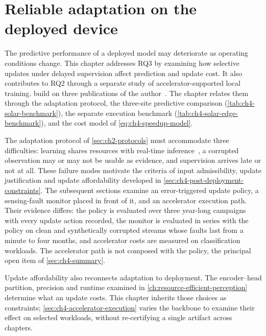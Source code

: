 \chapter{Reliable adaptation on the deployed device}
\label{ch:on-device-adaptation}

The predictive performance of a deployed model may deteriorate as operating conditions change. This chapter addresses RQ3 by examining how selective updates under delayed supervision affect prediction and update cost. It also contributes to RQ2 through a separate study of accelerator-supported local training.  build on three publications of the author~\cite{10.1007/978-3-032-07343-328,Piechocki2025:i63677,piechocki2026empowering}. The chapter relates them through the adaptation protocol, the three-site predictive comparison (\cref{tab:ch4-solar-benchmark}), the separate execution benchmark (\cref{tab:ch4-solar-edge-benchmark}), and the cost model of \cref{eq:ch4-speedup-model}.

The adaptation protocol of \cref{sec:ch2-protocols} must accommodate three difficulties: learning shares resources with real-time inference~\cite{satyanarayanan2017emergence}, a corrupted observation may or may not be usable as evidence, and supervision arrives late or not at all. These failure modes motivate the criteria of input admissibility, update justification and update affordability developed in \cref{sec:ch4-post-deployment-constraints}. The subsequent sections examine an error-triggered update policy, a sensing-fault monitor placed in front of it, and an accelerator execution path. Their evidence differs: the policy is evaluated over three year-long campaigns with every update action recorded, the monitor is evaluated in series with the policy on clean and synthetically corrupted streams whose faults last from a minute to four months, and accelerator costs are measured on classification workloads. The accelerator path is not composed with the policy, the principal open item of \cref{sec:ch4-summary}.

Update affordability also reconnects adaptation to deployment. The encoder--head partition, precision and runtime examined in \cref{ch:resource-efficient-perception} determine what an update costs. This chapter inherits those choices as constraints; \cref{sec:ch4-accelerator-execution} varies the backbone to examine their effect on selected workloads, without re-certifying a single artifact across chapters.

